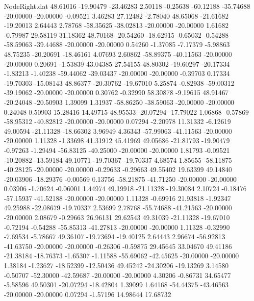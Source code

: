 \begin{filecontents}{NodeRight.dat}
  48.61016  -19.90479  -23.46283     2.50118   -0.25638  -60.12188  -35.74688  -20.00000  -20.00000   -0.09521    3.46283   27.12482   -2.78040
  48.65068  -21.61682  -19.20013     2.64443    2.78768  -58.35625  -38.02813  -20.00000  -20.00000    1.61682   -0.79987   29.58119   31.18362
  48.70168  -20.54260  -18.62915    -0.65032   -0.54288  -58.59063  -39.44688  -20.00000  -20.00000    0.54260   -1.37085   -7.17379   -5.98863
  48.75235  -20.20691  -18.46161     4.07693    2.60862  -58.89375  -40.11563  -20.00000  -20.00000    0.20691   -1.53839   43.04385   27.54155
  48.80302  -19.60297  -20.17334    -1.83213   -1.40238  -59.44062  -39.03437  -20.00000  -20.00000   -0.39703    0.17334  -19.70303  -15.08143
  48.86377  -20.30762  -19.67010     5.25874   -0.82938  -59.00312  -39.19062  -20.00000  -20.00000    0.30762   -0.32990   58.30878   -9.19615
  48.91467  -20.24048  -20.50903     1.39099    1.31937  -58.86250  -38.59063  -20.00000  -20.00000    0.24048    0.50903   15.28416   14.49715
  48.95533  -20.07294  -17.79022     1.06868   -0.57869  -58.95312  -40.82812  -20.00000  -20.00000    0.07294   -2.20978   11.31332   -6.12619
  49.00594  -21.11328  -18.66302     3.96949    4.36343  -57.99063  -41.11563  -20.00000  -20.00000    1.11328   -1.33698   41.31912   45.41969
  49.05686  -21.81793  -19.90479    -0.97263   -1.29494  -56.83125  -40.25000  -20.00000  -20.00000    1.81793   -0.09521  -10.20882  -13.59184
  49.10771  -19.70367  -19.70337     4.68574    1.85655  -58.11875  -40.28125  -20.00000  -20.00000   -0.29633   -0.29663   49.55402   19.63399
  49.14840  -20.03906  -18.29376    -0.00569    0.13756  -58.21875  -41.71250  -20.00000  -20.00000    0.03906   -1.70624   -0.06001    1.44974
  49.19918  -21.11328  -19.30084     2.10724   -0.18476  -57.15937  -41.52188  -20.00000  -20.00000    1.11328   -0.69916   21.93818   -1.92347
  49.25988  -22.08679  -19.70337     2.53699    2.78768  -55.74688  -41.21563  -20.00000  -20.00000    2.08679   -0.29663   26.96131   29.62543
  49.31039  -21.11328  -19.67010    -0.72194   -0.54288  -55.85313  -41.27813  -20.00000  -20.00000    1.11328   -0.32990   -7.69534   -5.78667
  49.36107  -19.73694  -19.40125     2.64443    2.96674  -56.92813  -41.63750  -20.00000  -20.00000   -0.26306   -0.59875   29.45645   33.04670
  49.41186  -21.38184  -18.76373    -1.65307   -1.11588  -55.69062  -42.45625  -20.00000  -20.00000    1.38184   -1.23627  -18.52399  -12.50436
  49.45242  -24.30206  -19.13269     3.14580   -0.50707  -52.30000  -42.59687  -20.00000  -20.00000    4.30206   -0.86731   34.65477   -5.58596
  49.50301  -20.07294  -18.42804     1.39099    1.64168  -54.44375  -43.46563  -20.00000  -20.00000    0.07294   -1.57196   14.98644   17.68732

\end{filecontents}
